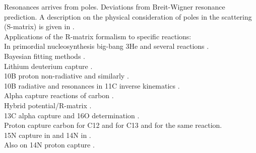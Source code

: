 \documentclass[openany]{book}
\begin{document}
Resonances arrives from poles. Deviations from Breit-Wigner resonance prediction. A description on the physical consideration of poles in the scattering (S-matrix) is given in \cite{ramirezjimenez_kelkar_2018}. \\

Applications of the R-matrix formalism to specific reactions: \\

In primordial nucleosynthesis \cite{desouza_iliadis_coc_2019} big-bang 3He and several reactions \cite{sparta_pizzone_bertulani_hou_lamia_tumino_2020}. \\

Bayesian fitting methods \cite{odell_brune_phillips_2022}. \\

Lithium deuterium capture \cite{grineviciute_lamia_mukhamedzhanov_spitaleri_lacognata_2015}. \\

10B proton non-radiative \cite{kolk_macon_deboer_anderson_boeltzig_brandenburg_brune_chen_clark_danley_et_2022} and similarly \cite{sieverding_randhawa_zetterberg_deboer_ahn_mancino_martinez-pinedo_hix_2022}. \\

10B radiative and resonances in 11C inverse kinematics \cite{kaur_guimaraes_zamora_assuncao_alcantara-nunez_delara_zevallos_ribeiro_lichtenthaler_pires_et_2022}. \\

Alpha capture reactions of carbon \cite{schurmann_gialanella_kunz_strieder_2012}.  \\

 Hybrid potential/R-matrix \cite{sparenberg_2005}. \\

 13C alpha capture and 16O determination \cite{prusachenko_bobrovsky_bondarenko_bokhovko_gurbich_ketlerov_2022}. \\

Proton capture carbon \cite{burtebaev_igamov_peterson_yarmukhamedov_zazulin_2008} for C12 and \cite{chakraborty_deboer_mukherjee_roy_2015} for C13 and \cite{genard_descouvemont_terwagne_2010} for the same reaction. \\

15N capture in \cite{barker_2008} and 14N in \cite{angulo_champagne_trautvetter_2005}.  \\

Also on 14N proton capture \cite{formicola_imbriani_costantini_angulo_bemmerer_bonetti_broggini_corvisiero_cruz_descouvemont_et_2004}. \\
\end{document}
